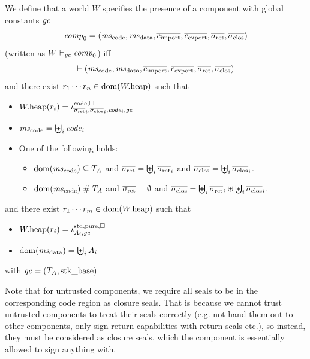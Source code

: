 \documentclass[a4paper]{article}
\begin{document}
\begin{definition}
  We define that a world $W$ specifies the presence of a component with global constants $\mathit{gc}$
  \begin{equation*}
    \var{comp}_0 = (\mscode,\msdata,\overline{c_{\mathrm{import}}},\overline{c_{\mathrm{export}}},\sigrets,\sigcloss)
  \end{equation*}
  (written as $W \vdash_{\mathit{gc}} \mathit{comp}_0$)
  iff
  \begin{equation*}
    \vdash (\mscode,\msdata,\overline{c_{\mathrm{import}}},\overline{c_{\mathrm{export}}},\sigrets,\sigcloss)
  \end{equation*}
  and there exist $r_1 \cdots r_n \in \mathrm{dom}(W.\mathrm{heap})$ such that
  \begin{itemize}
  \item $\pwheap(r_i) = \codereg{\sigrets_i,\sigcloss_i,\code_i,\gc}$
  \item $\mscode = \biguplus_i \code_i$
  \item One of the following holds:
    \begin{itemize}
    \item $\dom(\mscode) \subseteq \ta$ and $\sigrets = \biguplus_i \sigrets_i$ and $\sigcloss = \biguplus_i \sigcloss_i$.
    \item $\dom(\mscode) \mathrel{\#} \ta$ and $\sigrets = \emptyset$ and $\sigcloss = \biguplus_i \sigrets_i \uplus \biguplus_i \sigcloss_i$.
    \end{itemize}
  \end{itemize}
  and there exist $r_1 \cdots r_m \in \mathrm{dom}(W.\mathrm{heap})$ such that
  \begin{itemize}
  \item $W.\mathrm{heap}(r_i) = \iota^{\mathrm{std},\mathrm{pure},\square}_{A_i,\mathit{gc}}$
  \item $\dom(\msdata) = \biguplus_i A_i$
  \end{itemize}
  with $\mathit{gc} = (T_{A},\mathrm{stk\_base})$
\end{definition}
Note that for untrusted components, we require all seals to be in the corresponding code region as closure seals.
That is because we cannot trust untrusted components to treat their seals correctly (e.g. not hand them out to other components, only sign return capabilities with return seals etc.), so instead, they must be considered as closure seals, which the component is essentially allowed to sign anything with.
\end{document}
